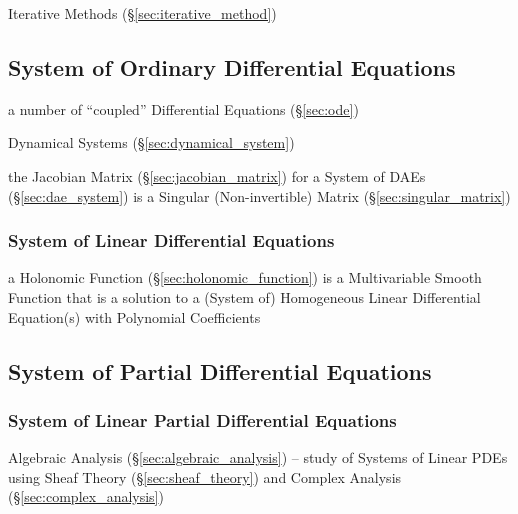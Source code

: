 \fist Iterative Methods (\S\ref{sec:iterative_method})



\subsection{System of Ordinary Differential Equations}\label{sec:ode_system}

a number of ``coupled'' Differential Equations (\S\ref{sec:ode})

\fist Dynamical Systems (\S\ref{sec:dynamical_system})

\fist the Jacobian Matrix (\S\ref{sec:jacobian_matrix}) for a System of DAEs
(\S\ref{sec:dae_system}) is a Singular (Non-invertible) Matrix
(\S\ref{sec:singular_matrix})



\subsubsection{System of Linear Differential Equations}
\label{sec:linear_ode_system}

a Holonomic Function (\S\ref{sec:holonomic_function}) is a Multivariable Smooth
Function that is a solution to a (System of) Homogeneous Linear Differential
Equation(s) with Polynomial Coefficients



\subsection{System of Partial Differential Equations}\label{sec:pde_system}

\subsubsection{System of Linear Partial Differential Equations}
\label{sec:linear_pde_system}

\fist Algebraic Analysis (\S\ref{sec:algebraic_analysis}) -- study of Systems of
Linear PDEs using Sheaf Theory (\S\ref{sec:sheaf_theory}) and Complex Analysis
(\S\ref{sec:complex_analysis})



